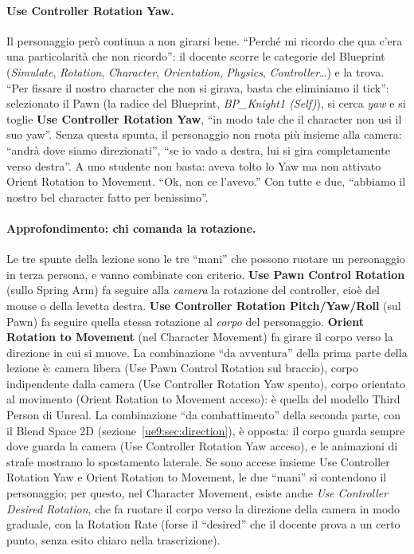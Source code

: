 \paragraph{Use Controller Rotation Yaw.} Il personaggio però continua a non girarsi bene.
``Perché mi ricordo che qua c'era una particolarità che non ricordo'': il docente scorre
le categorie del Blueprint (\emph{Simulate}, \emph{Rotation}, \emph{Character},
\emph{Orientation}, \emph{Physics}, \emph{Controller}\dots) e la trova. ``Per fissare il
nostro character che non si girava, basta che eliminiamo il tick'': selezionato il Pawn
(la radice del Blueprint, \emph{BP\_Knight1 (Self)}), si cerca \emph{yaw} e si toglie
\textbf{Use Controller Rotation Yaw}, ``in modo tale che il character non usi il suo
yaw''. Senza questa spunta, il personaggio non ruota più insieme alla camera: ``andrà
dove siamo direzionati'', ``se io vado a destra, lui si gira completamente verso
destra''. A uno studente non basta: aveva tolto lo Yaw ma non attivato Orient Rotation to
Movement. ``Ok, non ce l'avevo.'' Con tutte e due, ``abbiamo il nostro bel character
fatto per benissimo''.

\paragraph{Approfondimento: chi comanda la rotazione.} Le tre spunte della lezione sono
le tre ``mani'' che possono ruotare un personaggio in terza persona, e vanno combinate
con criterio. \textbf{Use Pawn Control Rotation} (sullo Spring Arm) fa seguire alla
\emph{camera} la rotazione del controller, cioè del mouse o della levetta destra.
\textbf{Use Controller Rotation Pitch/Yaw/Roll} (sul Pawn) fa seguire quella stessa
rotazione al \emph{corpo} del personaggio. \textbf{Orient Rotation to Movement} (nel
Character Movement) fa girare il corpo verso la direzione in cui si muove. La
combinazione ``da avventura'' della prima parte della lezione è: camera libera (Use Pawn
Control Rotation sul braccio), corpo indipendente dalla camera (Use Controller Rotation
Yaw spento), corpo orientato al movimento (Orient Rotation to Movement acceso): è quella
del modello Third Person di Unreal. La combinazione ``da combattimento'' della seconda
parte, con il Blend Space 2D (sezione~\ref{ue9:sec:direction}), è opposta: il corpo
guarda sempre dove guarda la camera (Use Controller Rotation Yaw acceso), e le
animazioni di strafe mostrano lo spostamento laterale. Se sono accese insieme Use
Controller Rotation Yaw e Orient Rotation to Movement, le due ``mani'' si contendono il
personaggio; per questo, nel Character Movement, esiste anche \emph{Use Controller
Desired Rotation}, che fa ruotare il corpo verso la direzione della camera in modo
graduale, con la Rotation Rate (forse il ``desired'' che il docente prova a un certo
punto, senza esito chiaro nella trascrizione).

